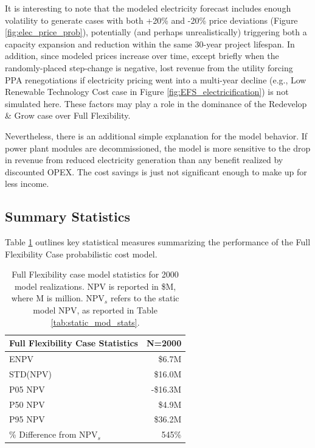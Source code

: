 It is interesting to note that the modeled electricity forecast includes enough volatility to generate cases with both +20\% and -20\% price deviations (Figure \ref{fig:elec_price_prob}), potentially (and perhaps unrealistically) triggering both a capacity expansion and reduction within the same 30-year project lifespan. In addition, since modeled prices increase over time, except briefly when the randomly-placed step-change is negative, lost revenue from the utility forcing PPA renegotiations if electricity pricing went into a multi-year decline (e.g., Low Renewable Technology Cost case in Figure \ref{fig:EFS_electricification}) is not simulated here. These factors may play a role in the dominance of the Redevelop \& Grow case over Full Flexibility.

Nevertheless, there is an additional simple explanation for the model behavior. If power plant modules are decommissioned, the model is more sensitive to the drop in revenue from reduced electricity generation than any benefit realized by discounted OPEX. The cost savings is just not significant enough to make up for less income.

\subsection{Summary Statistics}
\label{ch6:reduce_stats}

Table \ref{tab:reduce_stats} outlines key statistical measures summarizing the performance of the Full Flexibility Case probabilistic cost model.

\begin{table}[H]
\centering
\begin{tabular}{|l|r|}
\hline
\textbf{Full Flexibility Case Statistics} & N=2000 \\ \hline
ENPV & \$6.7M \\ \hline
STD(NPV) & \$16.0M \\ \hline
P05 NPV & -\$16.3M \\ \hline
P50 NPV & \$4.9M \\ \hline
P95 NPV & \$36.2M \\ \hline
\% Difference from NPV$_{s}$ & 545\% \\ \hline
\end{tabular}
\caption[Full Flexibility Case statistics]{Full Flexibility case model statistics for 2000 model realizations. NPV is reported in \$M, where M is million. NPV$_s$ refers to the static model NPV, as reported in Table \ref{tab:static_mod_stats}.}
\label{tab:reduce_stats}
\end{table}

